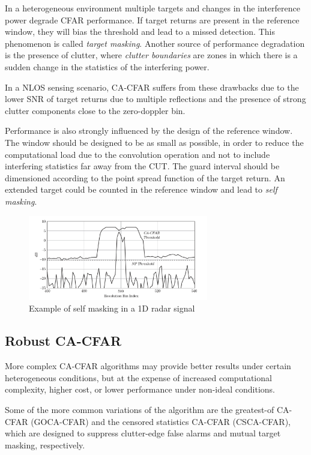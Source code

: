 In a heterogeneous environment multiple targets and changes in the interference power degrade CFAR performance. If target returns are present in the reference window, they will bias the threshold and lead to a missed detection. This phenomenon is called \textit{target masking}. Another source of performance degradation is the presence of clutter, where \textit{clutter boundaries} are zones in which there is a sudden change in the statistics of the interfering power.

In a NLOS sensing scenario, CA-CFAR suffers from these drawbacks due to the lower SNR of target returns due to multiple reflections and the presence of strong clutter components close to the zero-doppler bin.

Performance is also strongly influenced by the design of the reference window. The window should be designed to be as small as possible, in order to reduce the computational load due to the convolution operation and not to include interfering statistics far away from the CUT. The guard interval should be dimensioned according to the point spread function of the target return. An extended target could be counted in the reference window and lead to \textit{self masking}.

\begin{figure}[H]
	\centering
	\includegraphics[width=0.7\textwidth]{Images/radar_detect_threshold/self_masking_Richards2010.png}
	\caption{Example of self masking in a 1D radar signal \cite{Richards_Scheer_Holm_2010}}
	\label{fig:self_masking_Richards2010}
\end{figure}

\subsection{Robust CA-CFAR}
More complex CA-CFAR algorithms may provide better results under certain heterogeneous conditions, but at the expense of increased computational complexity, higher cost, or lower performance under non-ideal conditions.

Some of the more common variations of the algorithm are the greatest-of CA-CFAR (GOCA-CFAR) and the censored statistics CA-CFAR (CSCA-CFAR), which are designed to suppress clutter-edge false alarms and mutual target masking, respectively.

